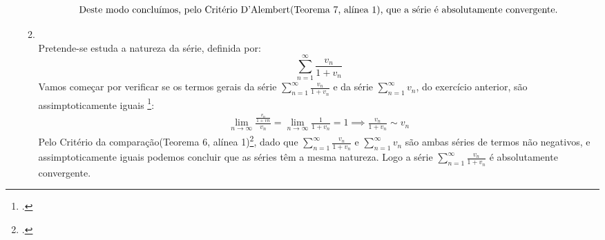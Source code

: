 \begin{enumerate}[label=\arabic{section}.\arabic*.]
\begin{enumerate}[label=\arabic{section}.\arabic{enumi}.\arabic*.]
\begin{align*}
					  \intertext{Deste modo concluímos, pelo Critério
						  D'Alembert(Teorema 7, alínea 1), que a série é
					  absolutamente convergente.}
				  \end{align*}
			\item \; \\
				  Pretende-se estuda a natureza da série, definida por:
				  \begin{equation}\label{eq:efa-1-3-2}
			            \sum_{n=1}^{\infty} \frac{v_n}{1 + v_n}
		          \end{equation}
				  Vamos começar por verificar se os termos gerais
				  da série $\sum_{n=1}^{\infty} \frac{v_n}{1 + v_n}$  e da
				  série $\sum_{n=1}^{\infty} v_n$, do exercício anterior, são
				  assimptoticamente iguais
				  \footcite[pág. 384, Definição 7]{Santos2016}:
				  \begin{align*}
					  \lim_{n \to \infty} \frac{\frac{v_n}{1+vn}}{v_n} =
					  \lim_{n \to \infty} \frac{1}{1 + v_n} = 1 \implies
					  \frac{v_n}{1 + v_n} \sim v_n
				  \end{align*}
				  Pelo Critério da
				  comparação(Teorema 6, alínea 1)\footcite[pág.
				  595]{Santos2016}, dado que
				  $\sum_{n=1}^{\infty} \frac{v_n}{1 + v_n}$ e
				  $\sum_{n=1}^{\infty} v_n$ são ambas séries de termos
				  não negativos, e assimptoticamente iguais podemos concluir 
				  que as séries têm a mesma natureza. Logo a série
				  $\sum_{n=1}^{\infty} \frac{v_n}{1 + v_n}$ é absolutamente
				  convergente.
	      \end{enumerate}
\end{enumerate}

